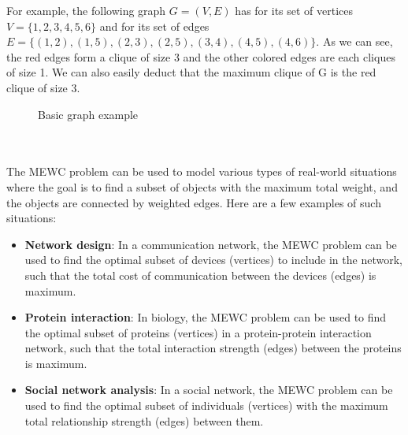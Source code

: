 \begin{minipage}{0.5\textwidth}
    For example, the following graph $G=(V,E)$ has for its set of vertices
    $V=\{1,2,3,4,5,6\}$ and for its set of edges
    $E=\{(1,2),(1,5),(2,3),(2,5),(3,4),(4,5),(4,6)\}$.
    As we can see, the red edges form a clique of size 3 and the other colored
    edges are each cliques of size 1. We can also easily deduct that the maximum
    clique of G is the red clique of size 3.
\end{minipage}
\begin{minipage}{0.5\textwidth}
    \begin{figure}[H]
        \centering
        \caption{Basic graph example}
    \end{figure}
\end{minipage} \\ \\

The MEWC problem can be used to model various types of real-world situations where
the goal is to find a subset of objects with the maximum total weight, and the
objects are connected by weighted edges. Here are a few examples of such situations:

\begin{itemize}
    \item \textbf{Network design}: In a communication network, the MEWC problem
          can be used to find the optimal subset of devices (vertices) to include in
          the network, such that the total cost of communication between the devices
          (edges) is maximum.
    \item \textbf{Protein interaction}: In biology, the MEWC problem can be used
          to find the optimal subset of proteins (vertices) in a protein-protein
          interaction network, such that the total interaction strength (edges)
          between the proteins is maximum.
    \item \textbf{Social network analysis}: In a social network, the MEWC problem
          can be used to find the optimal subset of individuals (vertices) with
          the maximum total relationship strength (edges) between them.
\end{itemize}

